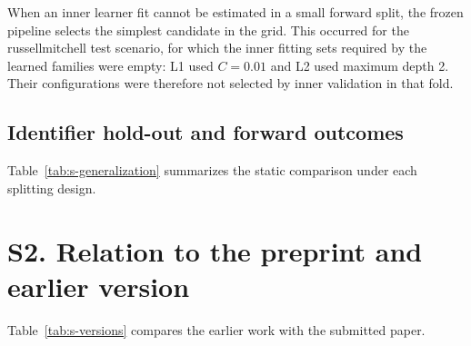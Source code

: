 \documentclass[pdflatex,sn-basic,Numbered]{sn-jnl}
\begin{document}
When an inner learner fit cannot be estimated in a small forward split, the frozen pipeline selects the simplest candidate in the grid. This occurred for the russellmitchell test scenario, for which the inner fitting sets required by the learned families were empty: L1 used $C=0.01$ and L2 used maximum depth 2. Their configurations were therefore not selected by inner validation in that fold.

\subsection*{Identifier hold-out and forward outcomes}
Table~\ref{tab:s-generalization} summarizes the static comparison under each splitting design.
\begin{tableorg}[t]
\centering
\caption{Static coverage (critical intervals at $k=100$): leave-one-scenario-out without hold-out (of 32), strict identifier hold-out by hash group (of 32 each), and forward chaining over five eligible test scenarios (of 20).}
\label{tab:s-generalization}
\small
\unskip
\end{tableorg}
\FloatBarrier

\section*{S2. Relation to the preprint and earlier version}
Table~\ref{tab:s-versions} compares the earlier work with the submitted paper.
\end{document}
